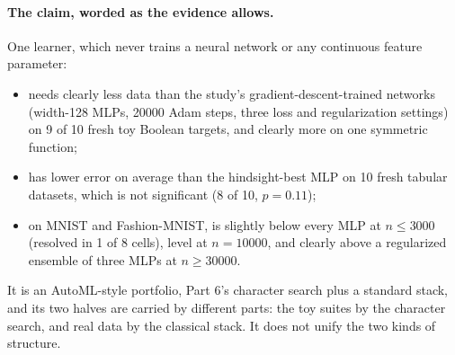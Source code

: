 \paragraph{The claim, worded as the evidence allows.} One learner, which never trains a neural network or any continuous feature parameter:
\begin{itemize}
\item needs clearly less data than the study's gradient-descent-trained networks (width-128 MLPs, 20000 Adam steps, three loss and regularization settings) on 9 of 10 fresh toy Boolean targets, and clearly more on one symmetric function;
\item has lower error on average than the hindsight-best MLP on 10 fresh tabular datasets, which is not significant (8 of 10, $p=0.11$);
\item on MNIST and Fashion-MNIST, is slightly below every MLP at $n\le3000$ (resolved in 1 of 8 cells), level at $n=10000$, and clearly above a regularized ensemble of three MLPs at $n\ge30000$.
\end{itemize}
It is an AutoML-style portfolio, Part 6's character search plus a standard stack, and its two halves are carried by different parts: the toy suites by the character search, and real data by the classical stack. It does not unify the two kinds of structure.
